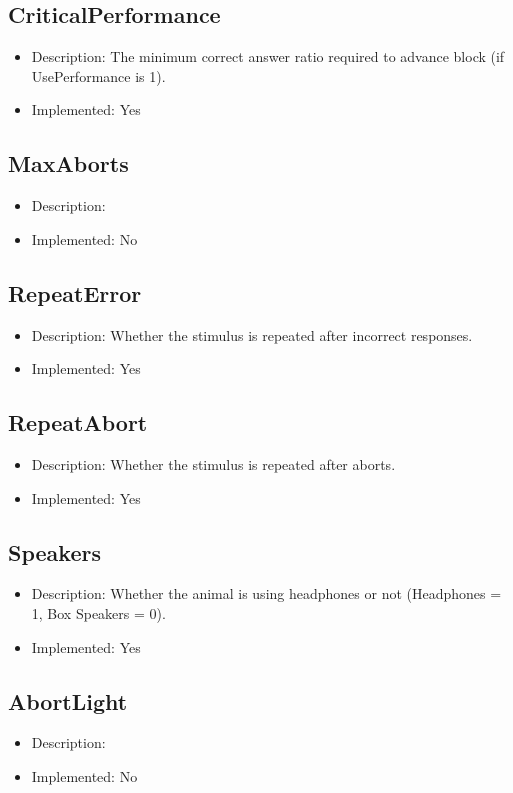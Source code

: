 \subsection*{CriticalPerformance}
\begin{itemize}
	\item Description: The minimum correct answer ratio required to advance block (if UsePerformance is 1).
	\item Implemented: Yes
\end{itemize}

\subsection*{MaxAborts}
\begin{itemize}
	\item Description: 
	\item Implemented: No
\end{itemize}

\subsection*{RepeatError}
\begin{itemize}
	\item Description: Whether the stimulus is repeated after incorrect responses.
	\item Implemented: Yes
\end{itemize}

\subsection*{RepeatAbort}
\begin{itemize}
	\item Description: Whether the stimulus is repeated after aborts.
	\item Implemented: Yes
\end{itemize}

\subsection*{Speakers}
\begin{itemize}
	\item Description: Whether the animal is using headphones or not (Headphones = 1, Box Speakers = 0).
	\item Implemented: Yes
\end{itemize}

\subsection*{AbortLight}
\begin{itemize}
	\item Description: 
	\item Implemented: No
\end{itemize}

